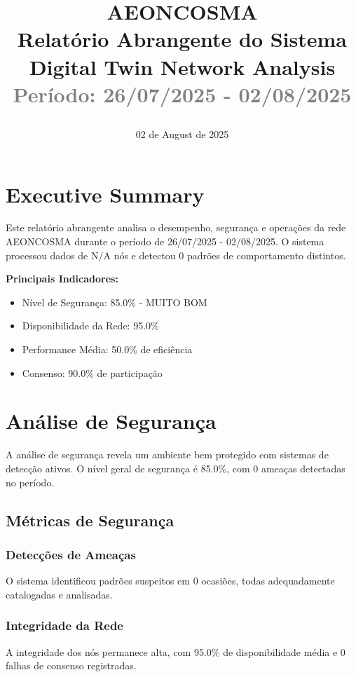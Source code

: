 \documentclass[12pt,a4paper]{report}
\title{
    \vspace{-2cm}
    \begin{center}
        \textbf{\Huge AEONCOSMA}\\[0.8cm]
        \textbf{\LARGE Relatório Abrangente do Sistema}\\[0.5cm]
        \textcolor{aeonblue}{\Large Digital Twin Network Analysis}\\[0.3cm]
        \textcolor{gray}{\large Período: 26/07/2025 - 02/08/2025}
    \end{center}
    \vspace{-1cm}
}
\date{02 de August de 2025}
\begin{document}
\maketitle
\thispagestyle{empty}

\newpage

\tableofcontents

\newpage

\chapter{Executive Summary}


Este relatório abrangente analisa o desempenho, segurança e operações da rede AEONCOSMA 
durante o período de 26/07/2025 - 02/08/2025. O sistema processou dados de N/A nós 
e detectou 0 padrões de comportamento distintos.

\textbf{Principais Indicadores:}
\begin{itemize}
\item Nível de Segurança: \textcolor{aeonblue}{85.0\% - MUITO BOM}
\item Disponibilidade da Rede: 95.0\%
\item Performance Média: 50.0\% de eficiência
\item Consenso: 90.0\% de participação
\end{itemize}


\chapter{Análise de Segurança}


A análise de segurança revela um ambiente bem protegido com sistemas de detecção ativos. 
O nível geral de segurança é 85.0\%, 
com 0 ameaças detectadas no período.

\section{Métricas de Segurança}

\subsection{Detecções de Ameaças}
O sistema identificou padrões suspeitos em 0 ocasiões, 
todas adequadamente catalogadas e analisadas.

\subsection{Integridade da Rede}
A integridade dos nós permanece alta, com 95.0\% 
de disponibilidade média e 0 falhas de consenso registradas.
\end{document}
